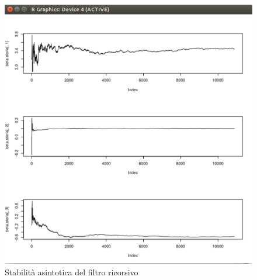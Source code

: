 \begin{figure}[H]
  \centering
  \includegraphics[width=.55\columnwidth]{images/lm/kalman-asymptotic.eps}
  \caption{Stabilità asintotica del filtro ricorsivo}
    \label{fig:kalman-asymptotic}
\end{figure}
